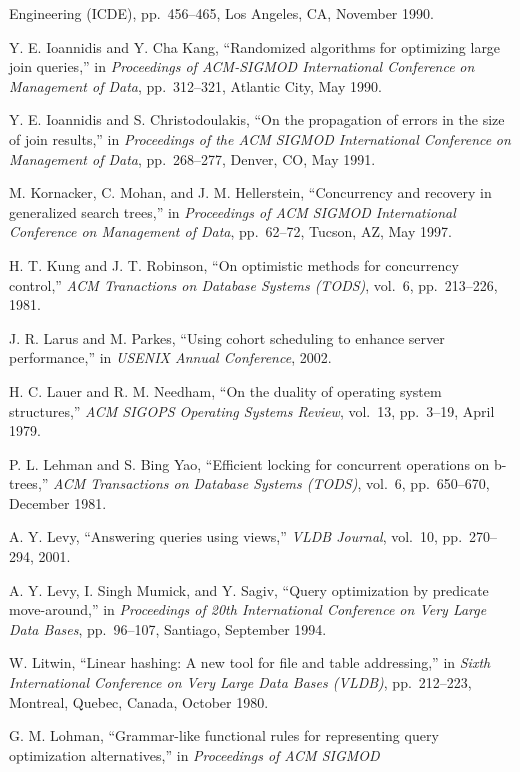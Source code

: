 \documentclass[a4paper,11pt,twoside,openright]{book}
\begin{document}
\begin{enumerate}[label={[\arabic*]}]
{  Engineering (ICDE)}, pp.~456--465, Los Angeles, CA, November 1990.
\item
  Y. E. Ioannidis and Y. Cha Kang, ``Randomized algorithms for
  optimizing large join queries,'' in \emph{Proceedings of ACM-SIGMOD
  International Conference} \emph{on Management of Data}, pp.~312--321,
  Atlantic City, May 1990.
\item
  Y. E. Ioannidis and S. Christodoulakis, ``On the propagation of errors
  in the size of join results,'' in \emph{Proceedings of the ACM SIGMOD
  International Conference} \emph{on Management of Data}, pp.~268--277,
  Denver, CO, May 1991.
\item
  M. Kornacker, C. Mohan, and J. M. Hellerstein, ``Concurrency and
  recovery in generalized search trees,'' in \emph{Proceedings of ACM
  SIGMOD International} \emph{Conference on Management of Data},
  pp.~62--72, Tucson, AZ, May 1997.
\item
  H. T. Kung and J. T. Robinson, ``On optimistic methods for concurrency
  control,'' \emph{ACM Tranactions on Database Systems (TODS)}, vol.~6,
  pp.~213--226, 1981.
\item
  J. R. Larus and M. Parkes, ``Using cohort scheduling to enhance server
  performance,'' in \emph{USENIX Annual Conference}, 2002.
\item
  H. C. Lauer and R. M. Needham, ``On the duality of operating system
  structures,'' \emph{ACM SIGOPS Operating Systems Review}, vol.~13,
  pp.~3--19, April 1979.
\item
  P. L. Lehman and S. Bing Yao, ``Efficient locking for concurrent
  operations on b-trees,'' \emph{ACM Transactions on Database Systems
  (TODS)}, vol.~6, pp.~650--670, December 1981.
\item
  A. Y. Levy, ``Answering queries using views,'' \emph{VLDB Journal},
  vol.~10, pp.~270-- 294, 2001.
\item
  A. Y. Levy, I. Singh Mumick, and Y. Sagiv, ``Query optimization by
  predicate move-around,'' in \emph{Proceedings of 20th International
  Conference on Very Large} \emph{Data Bases}, pp.~96--107, Santiago,
  September 1994.
\item
  W. Litwin, ``Linear hashing: A new tool for file and table
  addressing,'' in \emph{Sixth} \emph{International Conference on Very
  Large Data Bases (VLDB)}, pp.~212--223, Montreal, Quebec, Canada,
  October 1980.
\item
  G. M. Lohman, ``Grammar-like functional rules for representing query
  optimization alternatives,'' in \emph{Proceedings of ACM SIGMOD
}
\end{enumerate}
\end{document}
